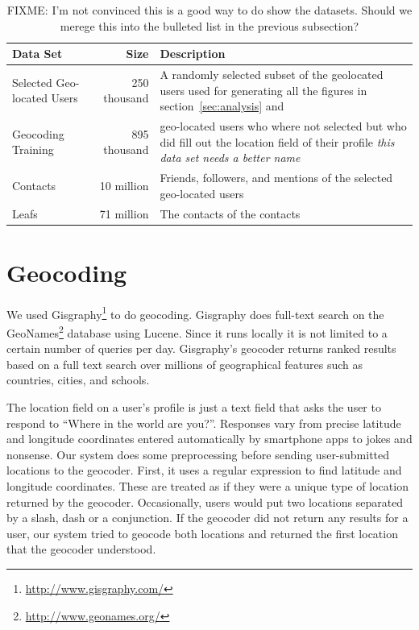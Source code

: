 \begin{table}[tbh]
\centering
\begin{tabular}{l r l}
    Data Set & Size & Description \\
    \hline
    Selected Geo-located Users & 250 thousand & A randomly selected subset of
    the geolocated users used for generating all the figures in
    section~\ref{sec:analysis} and   \\
    Geocoding Training & 895 thousand & geo-located users who where not
    selected but who did fill out the location field of their profile 
    \emph{this data set needs a better name}\\
    Contacts & 10 million & Friends, followers, and mentions of the selected
    geo-located users \\
    Leafs & 71 million & The contacts of the contacts \\
\end{tabular}
\label{tab:DataTypes}
\caption{FIXME: I'm not convinced this is a good way to do show the datasets. Should we merege this into the bulleted list in the previous subsection?}
\end{table}

\section{Geocoding}
We used Gisgraphy\footnote{\url{http://www.gisgraphy.com/}} to do geocoding.
%
Gisgraphy does full-text search on the
GeoNames\footnote{\url{http://www.geonames.org/}} database using Lucene.
%
Since it runs locally it is not limited to a certain number of queries per day.
%
Gisgraphy's geocoder returns ranked results based on a full text search
over millions of geographical features such as countries, cities, and schools.

The location field on a user's profile is just a text field that asks the user
to respond to ``Where in the world are you?''.
%
Responses vary from precise latitude and longitude coordinates entered
automatically by smartphone apps to jokes and nonsense.
Our system does some preprocessing before sending user-submitted locations to
the geocoder.
First, it uses a regular expression to find latitude and longitude coordinates.
These are treated as if they were a unique type of location returned by the
geocoder.
Occasionally, users would put two locations separated by a slash, dash or a
conjunction.
If the geocoder did not return any results for a user, our system tried to
geocode both locations and returned the first location that the geocoder
understood.

